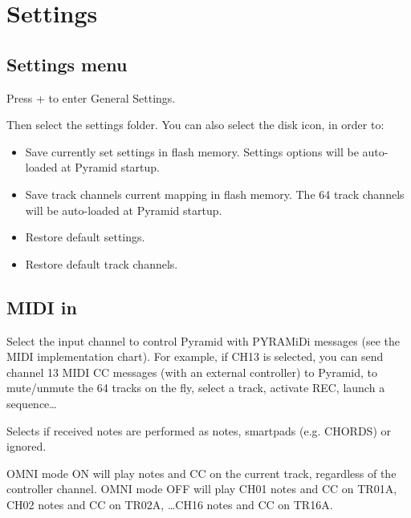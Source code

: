 \chapter{Settings}

\section{Settings menu}

Press  +  to enter General Settings.


Then select the settings folder. You can also select the disk icon, in order to:

\begin{itemize}
\item Save currently set settings in flash memory. Settings options will be auto-loaded at Pyramid startup.
\item Save track channels current mapping in flash memory. The 64 track channels will be auto-loaded at Pyramid startup.
\item Restore default settings.
\item Restore default track channels.
\end{itemize}



\section{MIDI in}

  \btn{\ldots}  

Select the input channel to control Pyramid with PYRAMiDi messages (see the MIDI implementation chart). For example, if CH13 is selected, you can send channel 13 MIDI CC messages (with an external controller) to Pyramid, to mute/unmute the 64 tracks on the fly, select a track, activate REC, launch a sequence\ldots

   

Selects if received notes are performed as notes, smartpads (e.g. CHORDS) or ignored.

  

OMNI mode ON will play notes and CC on the current track, regardless of the controller channel. OMNI mode OFF will play CH01 notes and CC on TR01A, CH02 notes and CC on TR02A, \ldots CH16 notes and CC on TR16A.

